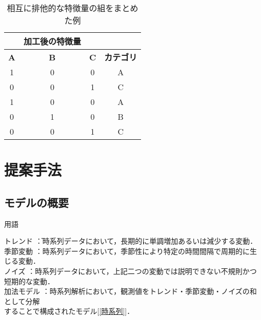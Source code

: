 \documentclass[dvipdfmx]{jreport}
\begin{document}
\begin{table}[h]
    \centering
    \caption{相互に排他的な特徴量の組をまとめた例} \label{tab:10}
    \begin{tabular}{|c|c|c|c|}
        \hline
        \rowcolor{gray!20}
        \hline
        \multicolumn{3}{|c|}{\textbf{元の特徴量}} & \textbf{加工後の特徴量} \\ 
        \hline
        \rowcolor{gray!20}
        \textbf{A} & \textbf{B} & \textbf{C} & \textbf{カテゴリ} \\ 
        \hline \hline
        1 & 0 & 0 & A \\ 
        \hline
        0 & 0 & 1 & C \\ 
        \hline
        1 & 0 & 0 & A \\ 
        \hline
        0 & 1 & 0 & B \\ 
        \hline
        0 & 0 & 1 & C \\ 
        \hline
    \end{tabular}
\end{table}

\newpage
\section{提案手法}
\subsection{モデルの概要}
\label{加法モデル}
\begin{itembox}[l]{\large{用語}}
    \begin{tabbing}
        \hspace{15pt} \raisebox{0.5ex}{\tiny $\bullet$} トレンド \hspace{7pt}\=：時系列データにおいて，長期的に単調増加あるいは減少する変動．\\[0.5em]
        \hspace{15pt} \raisebox{0.5ex}{\tiny $\bullet$} 季節変動 \>：時系列データにおいて，季節性により特定の時間間隔で周期的に生じる変動．\\[0.5em]
        \hspace{15pt} \raisebox{0.5ex}{\tiny $\bullet$} ノイズ \>：時系列データにおいて，上記二つの変動では説明できない不規則かつ短期的な変動． \\[0.5em]     
        \hspace{15pt} \raisebox{0.5ex}{\tiny $\bullet$} 加法モデル \>：時系列解析において，観測値をトレンド・季節変動・ノイズの和として分解\\[0.5em]\>\hspace{6.5pt}することで構成されたモデル[\ref{時系列}]．
    \end{tabbing}
\end{itembox}
\end{document}
